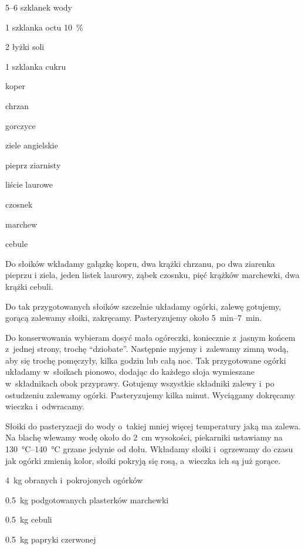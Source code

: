 \documentclass[../kucharek.tex]{subfiles}
\begin{document}

\begin{Ingred}[zalewa]
    \item \numrange{5}{6} szklanek wody
    \item \num{1} szklanka octu \qty{10}{\percent}
    \item \num{2} łyżki soli
    \item \num{1} szklanka cukru
    \item koper
    \item chrzan
    \item gorczyce
    \item ziele angielskie
    \item pieprz ziarnisty
    \item liście laurowe
    \item czosnek
    \item marchew
    \item cebule
\end{Ingred}

Do słoików wkładamy gałązkę kopru, dwa krążki chrzanu, po dwa ziarenka pieprzu
i ziela, jeden listek laurowy, ząbek czosnku, pięć krążków marchewki, dwa
krążki cebuli.

Do tak przygotowanych słoików szczelnie układamy ogórki, zalewę gotujemy,
gorącą zalewamy słoiki, zakręcamy. Pasteryzujemy około
\qtyrange{5}{7}{\minute}.

Do konserwowania wybieram dosyć mała ogóreczki, koniecznie z~jasnym końcem
z~jednej strony, trochę \enquote{dziobate}. Następnie myjemy i~zalewamy zimną
wodą, aby się trochę pomęczyły, kilka godzin lub całą noc. Tak przygotowane
ogórki układamy w~słoikach pionowo, dodając do każdego słoja wymieszane
w~składnikach obok przyprawy. Gotujemy wszystkie składniki zalewy i~po
ostudzeniu zalewamy ogórki. Pasteryzujemy kilka minut. Wyciągamy dokręcamy
wieczka i~odwracamy.

Słoiki do pasteryzacji do wody o~takiej mniej więcej temperatury jaką ma
zalewa. Na blachę wlewamy wodę około do \qty{2}{\centi\metre} wysokości,
piekarniki ustawiamy na \qtyrange{130}{140}{\celsius} grzane jedynie od dołu.
Wkładamy słoiki i~ogrzewamy do czasu jak ogórki zmienią kolor, słoiki pokryją
się rosą, a~wieczka ich są już gorące.


\begin{Ingred}
    \item \qty{4}{\kilo\gram} obranych i~pokrojonych ogórków
    \item \qty{0.5}{\kilo\gram} podgotowanych plasterków marchewki
    \item \qty{0.5}{\kilo\gram} cebuli
    \item \qty{0.5}{\kilo\gram} papryki czerwonej
\end{Ingred}
\end{document}
